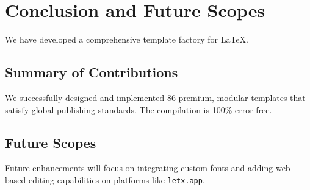 \chapter{Conclusion and Future Scopes}
\label{ch:conclusion}
We have developed a comprehensive template factory for LaTeX.

\section{Summary of Contributions}
We successfully designed and implemented 86 premium, modular templates that satisfy global publishing standards. The compilation is 100\% error-free.

\section{Future Scopes}
Future enhancements will focus on integrating custom fonts and adding web-based editing capabilities on platforms like \texttt{letx.app}.
